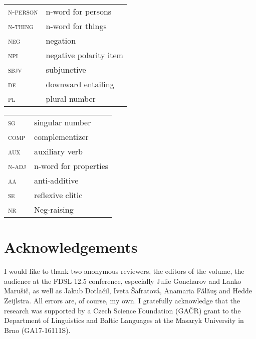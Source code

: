 \documentclass[output=paper, colorlinks, citecolor=brown, newtxmath]{langsci/langscibook}
\begin{document}
\begin{tabularx}{.5\textwidth}{@{}lX@{}}
\textsc{n-person}&{n-word for persons}\\
\textsc{n-thing}&n-word for things\\
\textsc{neg}&negation\\
\textsc{npi}&negative polarity item\\
\textsc{sbjv}&subjunctive\\
\textsc{de}&{downward entailing}\\
\textsc{pl}&{plural number}\\
\end{tabularx}%
\begin{tabularx}{.5\textwidth}{@{}lX@{}}
\textsc{sg}&{singular number}\\
\textsc{comp}&complementizer\\
\textsc{aux}&{auxiliary verb}\\
\textsc{n-adj}&{n-word for properties}\\
\textsc{aa}&{anti-additive  }\\
\textsc{se}&{reflexive clitic}\\
\textsc{nr}&Neg-raising\\
\end{tabularx}


\section*{Acknowledgements}

I would like to thank two anonymous reviewers, the editors of the volume, the audience at the FDSL 12.5 conference, especially Julie Goncharov and Lanko Marušič, as well as Jakub Dotlačil, Iveta Šafratová, Anamaria Fălăuş and Hedde Zeijlstra. All errors are, of course, my own. I gratefully acknowledge that the research was supported by a Czech Science Foundation (GAČR) grant to the Department of Linguistics and Baltic Languages at the Masaryk University in Brno (GA17-16111S).

\sloppy
\printbibliography[heading=subbibliography,notkeyword=this]

\end{document}
